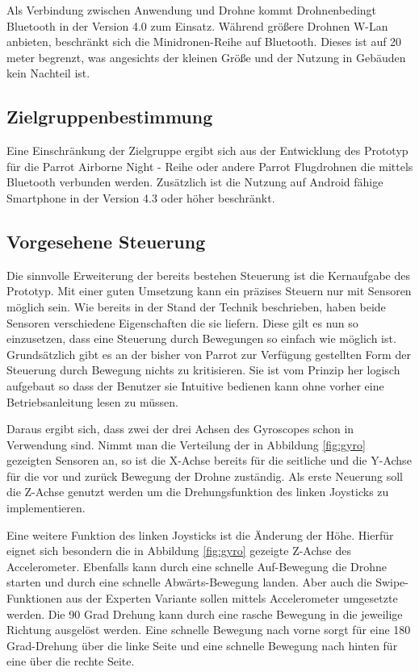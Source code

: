 \documentclass{article}
\begin{document}
Als Verbindung zwischen Anwendung und Drohne kommt Drohnenbedingt Bluetooth in der Version 4.0 zum Einsatz. Während größere Drohnen W-Lan anbieten, beschränkt sich die Minidronen-Reihe auf Bluetooth. Dieses ist auf 20 meter begrenzt, was angesichts der kleinen Größe und der Nutzung in Gebäuden kein Nachteil ist. 

\subsection{Zielgruppenbestimmung}
Eine Einschränkung der Zielgruppe ergibt sich aus der Entwicklung des Prototyp für die Parrot Airborne Night - Reihe oder andere Parrot Flugdrohnen die mittels Bluetooth verbunden werden. Zusätzlich ist die Nutzung auf Android fähige Smartphone in der Version 4.3 oder höher beschränkt.
  
\subsection{Vorgesehene Steuerung}
Die sinnvolle Erweiterung der bereits bestehen Steuerung ist die Kernaufgabe des Prototyp. Mit einer guten Umsetzung kann ein präzises Steuern nur mit Sensoren möglich sein. Wie bereits in der Stand der Technik beschrieben, haben beide Sensoren verschiedene Eigenschaften die sie liefern. Diese gilt es nun so einzusetzen, dass eine Steuerung durch Bewegungen so einfach wie möglich ist. Grundsätzlich gibt es an der bisher von Parrot zur Verfügung gestellten Form der Steuerung durch Bewegung nichts zu kritisieren. Sie ist vom Prinzip her logisch aufgebaut so dass der Benutzer sie Intuitive bedienen kann ohne vorher eine Betriebsanleitung lesen zu müssen. 

Daraus ergibt sich, dass zwei der drei Achsen des Gyroscopes schon in Verwendung sind. Nimmt man die Verteilung der in Abbildung \ref{fig:gyro} gezeigten Sensoren an, so ist die X-Achse bereits für die seitliche und die Y-Achse für die vor und zurück Bewegung der Drohne zuständig. Als erste Neuerung soll die Z-Achse genutzt werden um die Drehungsfunktion des linken Joysticks zu implementieren. 

Eine weitere Funktion des linken Joysticks ist die Änderung der Höhe. Hierfür eignet sich besondern die in Abbildung \ref{fig:gyro} gezeigte Z-Achse des Accelerometer. Ebenfalls kann durch eine schnelle Auf-Bewegung die Drohne starten und durch eine schnelle Abwärts-Bewegung landen. Aber auch die Swipe-Funktionen aus der Experten Variante sollen mittels Accelerometer umgesetzte werden. Die 90 Grad Drehung kann durch eine rasche Bewegung in die jeweilige Richtung ausgelöst werden. Eine schnelle Bewegung nach vorne sorgt für eine 180 Grad-Drehung über die linke Seite und eine schnelle Bewegung nach hinten für eine über die rechte Seite. 
\end{document}
